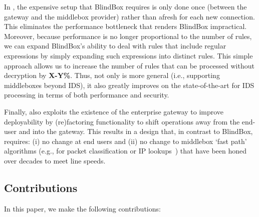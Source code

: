 In \sys, the expensive setup that BlindBox requires is only done once (between the gateway and the middlebox provider) rather 
than afresh for each new connection. This eliminates the performance bottleneck that renders BlindBox impractical. 
Moreover, because performance is no longer proportional to the number of rules, we can expand BlindBox's ability to deal with   
rules that include regular expressions by simply expanding such expressions into distinct rules. This simple approach allows us 
 to increase the number of rules that can be processed without decryption by {\bf X-Y\%}. Thus, not only is \sys more 
general (i.e., supporting middleboxes beyond IDS), it also greatly improves on the state-of-the-art for IDS processing in terms 
of both performance and security. 

Finally, \sys also exploits the existence of the enterprise gateway to improve deployability by (re)factoring functionality to shift 
operations away from the end-user and into the gateway. This results in a design that, in contrast to BlindBox, requires: (i) no 
change at end users and (ii) no change to middlebox `fast path' algorithms (e.g., for packet classification or IP lookups~\cite{varghese, mckeown, long, list}) 
that have been honed over decades to meet line speeds. 


\subsection{Contributions}
\label{sec:contributions}

In this paper, we make the following contributions: 

